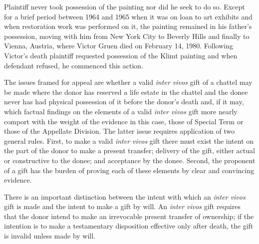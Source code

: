 Plaintiff never took possession of the painting nor did he seek to do so. Except
for a brief period between 1964 and 1965 when it was on loan to art exhibits
and when restoration work was performed on it, the painting remained in his
father's possession, moving with him from New York City to Beverly Hills and
finally to Vienna, Austria, where Victor Gruen died on February 14, 1980.
Following Victor's death plaintiff requested possession of the Klimt painting
and when defendant refused, he commenced this action.

The issues framed for appeal are whether a valid \textit{inter vivos} gift of a
chattel may be made where the donor has reserved a life estate in the chattel
and the donee never has had physical possession of it before the donor's death
and, if it may, which factual findings on the elements of a valid \textit{inter
vivos} gift more nearly comport with the weight of the evidence in this case,
those of Special Term or those of the Appellate Division. The latter issue
requires application of two general rules. First, to make a valid \textit{inter
vivos} gift there must exist the intent on the part of the donor to make a
present transfer; delivery of the gift, either actual or constructive to the
donee; and acceptance by the donee. Second, the proponent of a gift has the
burden of proving each of these elements by clear and convincing evidence.


There is an important distinction between the intent with which an \textit{inter
vivos} gift is made and the intent to make a gift by will. An \textit{inter
vivos} gift requires that the donor intend to make an irrevocable present
transfer of ownership; if the intention is to make a testamentary disposition
effective only after death, the gift is invalid unless made by will.

